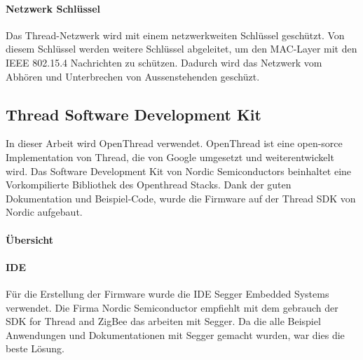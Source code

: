 \paragraph{Netzwerk Schlüssel}
Das Thread-Netzwerk wird mit einem netzwerkweiten Schlüssel geschützt. Von diesem Schlüssel werden weitere Schlüssel abgeleitet, um den MAC-Layer mit den IEEE 802.15.4 Nachrichten zu schützen. Dadurch wird das Netzwerk vom Abhören und Unterbrechen von Aussenstehenden geschüzt.\cite[Seite 1-5]{thread_group_inc_thread_2017}

\subsection{Thread Software Development Kit}\label{subsec:ThreadSoftwareDevelopmentKit}
In dieser Arbeit wird OpenThread verwendet. OpenThread ist eine open-sorce Implementation von Thread, die von Google umgesetzt und weiterentwickelt wird. Das Software Development Kit von Nordic Semiconductors beinhaltet eine Vorkompilierte Bibliothek des Openthread Stacks. Dank der guten Dokumentation und Beispiel-Code, wurde die Firmware auf der Thread SDK von Nordic aufgebaut. 

\paragraph{Übersicht}


\paragraph{IDE}
Für die Erstellung der Firmware wurde die IDE Segger Embedded Systems verwendet. Die Firma Nordic Semiconductor empfiehlt mit dem gebrauch der SDK for Thread and ZigBee das arbeiten mit Segger. Da die alle Beispiel Anwendungen und Dokumentationen mit Segger gemacht wurden, war dies die beste Lösung.
